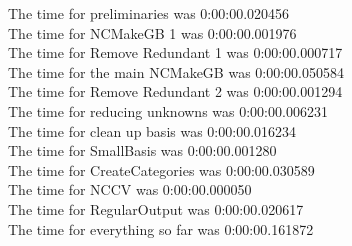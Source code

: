 \documentclass[rep10,leqno]{report}
\begin{document}
\noindent
The time for preliminaries was 0:00:00.020456\\
The time for NCMakeGB 1 was 0:00:00.001976\\
The time for Remove Redundant 1 was 0:00:00.000717\\
The time for the main NCMakeGB was 0:00:00.050584\\
The time for Remove Redundant 2 was 0:00:00.001294\\
The time for reducing unknowns was 0:00:00.006231\\
The time for clean up basis was 0:00:00.016234\\
The time for SmallBasis was 0:00:00.001280\\
The time for CreateCategories was 0:00:00.030589\\
The time for NCCV was 0:00:00.000050\\
The time for RegularOutput was 0:00:00.020617\\
The time for everything so far was 0:00:00.161872\\
\end{document}
